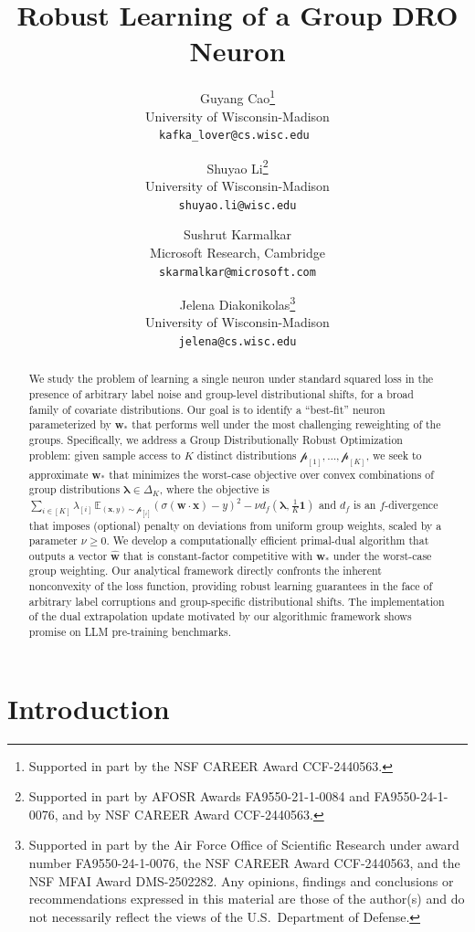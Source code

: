 \documentclass[11pt]{article}
\title{Robust Learning of a Group DRO Neuron}
\author{
Guyang Cao\thanks{Supported in part by the NSF CAREER Award CCF-2440563.} \\
University of Wisconsin-Madison\\
{\tt kafka\_lover@cs.wisc.edu }\\
\and 
Shuyao Li\thanks{Supported in part by  AFOSR Awards FA9550-21-1-0084 and FA9550-24-1-0076, and by NSF CAREER Award CCF-2440563.} \\
University of Wisconsin-Madison\\
{\tt shuyao.li@wisc.edu}\\
\and 
Sushrut Karmalkar\\
Microsoft Research, Cambridge\\
{\tt skarmalkar@microsoft.com}\\
\and 
Jelena Diakonikolas\thanks{Supported in part by the Air Force Office of Scientific Research under award number FA9550-24-1-0076, the NSF CAREER Award CCF-2440563, and the NSF MFAI Award DMS-2502282. Any opinions, findings and conclusions or recommendations expressed in this material are those of the author(s) and do not necessarily reflect the views of the U.S.\ Department of Defense.}\\
University of Wisconsin-Madison\\
{\tt jelena@cs.wisc.edu}
}
\date{}
\newcounter{thm}
\numberwithin{thm}{section}
\theoremstyle{plain}
\theoremstyle{definition}
\theoremstyle{remark} \newtheorem{remark}[thm]{Remark}
\def\pp{{\mathcal{p}}}
\newcommand{\E}{\mathbb{E}}
\newcommand{\lambdai}{\lambda_{[i]}}
\def\mathbf{\bm}
\begin{document}
\maketitle

\setcounter{page}{0}

\thispagestyle{empty}

\begin{abstract}
We study the problem of learning a single neuron under standard squared loss in the presence of arbitrary label noise and group-level distributional shifts, for a broad family of covariate distributions. Our goal is to identify a ``best-fit'' neuron parameterized by $\mathbf{w}_*$ that performs well under the most challenging reweighting of the groups. Specifically, we address a Group Distributionally Robust Optimization problem: given sample access to $K$ distinct distributions $\pp_{[1]},\dots,\pp_{[K]}$, we seek to approximate $\mathbf{w}_*$ that minimizes the worst-case objective over convex combinations of group distributions $\boldsymbol{\lambda} \in \Delta_K$, where the objective is $\sum_{i \in [K]}\lambdai\,\E_{(\mathbf x,y)\sim\pp_{[i]}}(\sigma(\mathbf w\cdot\mathbf x)-y)^2 - \nu d_f(\boldsymbol\lambda,\tfrac1K\mathbf1)$ and $d_f$ is an $f$-divergence that imposes (optional) penalty on deviations from uniform group weights, scaled by a parameter $\nu \geq 0$. 
We develop a computationally efficient primal-dual algorithm that outputs a vector $\widehat{\mathbf w}$ that is constant-factor
competitive with $\mathbf{w}_*$ under the worst-case group weighting.  
Our analytical framework directly confronts the inherent nonconvexity of the loss function, providing robust learning guarantees in the face of arbitrary label corruptions and group-specific distributional shifts. The implementation of the dual extrapolation update motivated by our algorithmic framework shows promise on LLM pre-training benchmarks. 
\end{abstract}

\newpage 
\section{Introduction}\label{sec:introduction}
\end{document}
